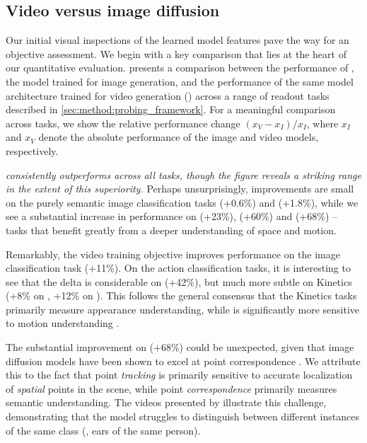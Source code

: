 \subsection{Video versus image diffusion}
\label{sec:exp:imagevsvideo}

Our initial visual inspections of the learned model features pave the way for an objective assessment.
We begin with a key comparison that lies at the heart of our quantitative evaluation.
 presents a comparison between the performance of \iwalt, the model trained for image generation, and the performance of the same model architecture trained for video generation (\vwalt) across a range of readout tasks described in \cref{sec:method:probing_framework}.
For a meaningful comparison across tasks, we show the relative performance change $(x_V-x_I)/x_I$, where $x_I$ and $x_V$ denote the absolute performance of the image and video models, respectively.

\emph{\vwalt consistently outperforms \iwalt across all tasks, though the figure reveals a striking range in the extent of this superiority.}
Perhaps unsurprisingly, improvements are small on the purely semantic image classification tasks \Tplaces (+0.6\%) and \Timagenet (+1.8\%), while we see a substantial increase in performance on \Twaymo (+23\%), \Tpose (+60\%) and \Tpt (+68\%) -- tasks that benefit greatly from a deeper understanding of space and motion.

Remarkably, the video training objective improves performance on the image classification task \Tinat (+11\%).
On the action classification tasks, it is interesting to see that the delta is considerable on \Tssv (+42\%), but much more subtle on Kinetics (+8\% on \Tkfour, +12\% on \Tkseven).
This follows the general consensus that the Kinetics tasks primarily measure appearance understanding, while \Tssv is significantly more sensitive to motion understanding \cite{vjepa, sevilla2021only}.


The substantial improvement on \Tpt (+68\%) could be unexpected, given that image diffusion models have been shown to excel at point correspondence \cite{tang2023, hedlin2024unsupervised}.
We attribute this to the fact that point \emph{tracking} is primarily sensitive to accurate localization of \emph{spatial} points in the scene, while point \emph{correspondence} primarily measures semantic understanding.
The videos presented by \citet{hedlin2024unsupervised} illustrate this challenge, demonstrating that the model struggles to distinguish between different instances of the same class (\eg, ears of the same person).

